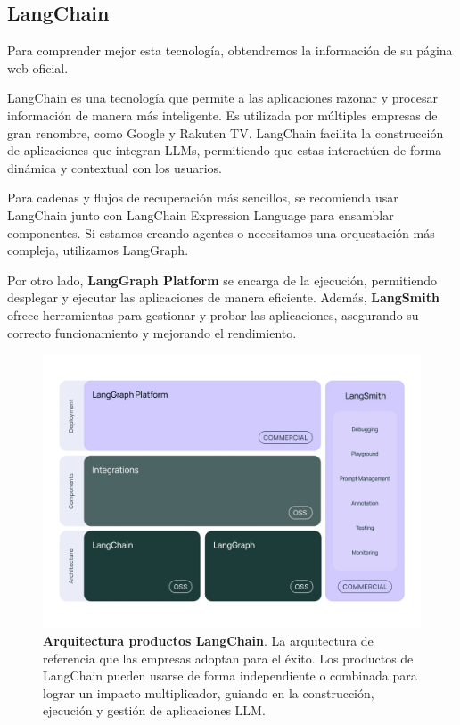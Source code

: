\newpage

\subsection{LangChain}

Para comprender mejor esta tecnología, obtendremos la información  de su página web oficial.

LangChain es una tecnología que permite a las aplicaciones razonar y procesar información de manera más inteligente. Es utilizada por múltiples empresas de gran renombre, como Google y Rakuten TV. LangChain facilita la construcción de aplicaciones que integran LLMs, permitiendo que estas interactúen de forma dinámica y contextual con los usuarios.

Para cadenas y flujos de recuperación más sencillos, se recomienda usar LangChain junto con LangChain Expression Language para ensamblar componentes. Si estamos creando agentes o necesitamos una orquestación más compleja, utilizamos LangGraph.

Por otro lado, \textbf{LangGraph Platform} se encarga de la ejecución, permitiendo desplegar y ejecutar las aplicaciones de manera eficiente. Además, \textbf{LangSmith} ofrece herramientas para gestionar y probar las aplicaciones, asegurando su correcto funcionamiento y mejorando el rendimiento. \cite{PaginaLangChainOficial} \cite{mavroudis2024langchain}



\begin{figure}[H]
    \centering
    \includegraphics[width=\linewidth]{imagenes/lg.jpg}
    \caption[\textbf{Arquitectura productos LangChain}.]{\textbf{Arquitectura productos LangChain}. La arquitectura de referencia que las empresas adoptan para el éxito. Los productos de LangChain pueden usarse de forma independiente o combinada para lograr un impacto multiplicador, guiando en la construcción, ejecución y gestión de aplicaciones LLM. \cite{PaginaLangChainOficial}}
    \label{productos-lang-chain} 
\end{figure}


